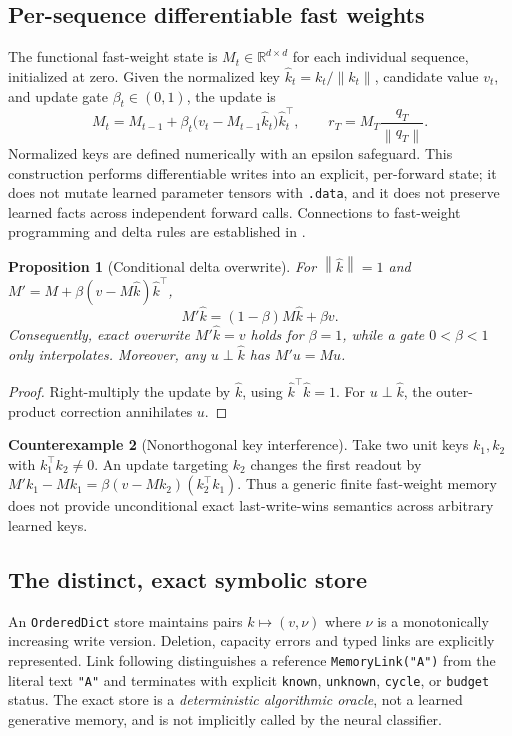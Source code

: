 \documentclass[11pt,a4paper]{article}
\theoremstyle{plain}\newtheorem{theorem}{Theorem}[section]\newtheorem{proposition}[theorem]{Proposition}\newtheorem{lemma}[theorem]{Lemma}
\theoremstyle{definition}\newtheorem{definition}[theorem]{Definition}\newtheorem{remark}[theorem]{Remark}\newtheorem{counterexample}[theorem]{Counterexample}
\newcommand{\R}{\mathbb R}\newcommand{\C}{\mathbb C}\newcommand{\Z}{\mathbb Z}\newcommand{\EE}{\mathbb E}\newcommand{\norm}[1]{\left\lVert #1\right\rVert}\newcommand{\tr}{\operatorname{tr}}\newcommand{\rank}{\operatorname{rank}}\newcommand{\diag}{\operatorname{diag}}\newcommand{\softmax}{\operatorname{softmax}}\newcommand{\Span}{\operatorname{span}}\newcommand{\NOTE}{\textsc{Status:}}
\begin{document}
\subsection{Per-sequence differentiable fast weights}
The functional fast-weight state is $M_t\in\R^{d\times d}$ for each individual sequence, initialized at zero. Given the normalized key $\hat k_t=k_t/\norm{k_t}$, candidate value $v_t$, and update gate $\beta_t\in(0,1)$, the update is
\begin{equation}\label{eq:delta}
 M_t=M_{t-1}+\beta_t\big(v_t-M_{t-1}\hat k_t\big)\hat k_t^\top,
 \qquad r_T=M_T\frac{q_T}{\norm{q_T}}.
\end{equation}
Normalized keys are defined numerically with an epsilon safeguard. This construction performs differentiable writes into an explicit, per-forward state; it does not mutate learned parameter tensors with \verb|.data|, and it does not preserve learned facts across independent forward calls. Connections to fast-weight programming and delta rules are established in \cite{schlag2021}.

\begin{proposition}[Conditional delta overwrite]\label{prop:delta}
For $\norm{\hat k}=1$ and $M'=M+\beta(v-M\hat k)\hat k^\top$,
\begin{equation}
 M'\hat k=(1-\beta)M\hat k+\beta v.
\end{equation}
Consequently, exact overwrite $M'\hat k=v$ holds for $\beta=1$, while a gate $0<\beta<1$ only interpolates. Moreover, any $u\perp\hat k$ has $M'u=Mu$.
\end{proposition}
\begin{proof}
Right-multiply the update by $\hat k$, using $\hat k^\top\hat k=1$. For $u\perp\hat k$, the outer-product correction annihilates $u$.
\end{proof}
\begin{counterexample}[Nonorthogonal key interference]\label{ce:cross}
Take two unit keys $k_1,k_2$ with $k_1^\top k_2\ne0$. An update targeting $k_2$ changes the first readout by
$M'k_1-Mk_1=\beta(v-Mk_2)(k_2^\top k_1)$. Thus a generic finite fast-weight memory does not provide unconditional exact last-write-wins semantics across arbitrary learned keys.
\end{counterexample}

\subsection{The distinct, exact symbolic store}
An \verb|OrderedDict| store maintains pairs $k\mapsto(v,\nu)$ where $\nu$ is a monotonically increasing write version. Deletion, capacity errors and typed links are explicitly represented. Link following distinguishes a reference \verb|MemoryLink("A")| from the literal text \verb|"A"| and terminates with explicit \texttt{known}, \texttt{unknown}, \texttt{cycle}, or \texttt{budget} status. The exact store is a \emph{deterministic algorithmic oracle}, not a learned generative memory, and is not implicitly called by the neural classifier.
\end{document}
